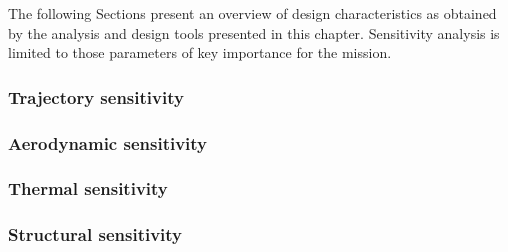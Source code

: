The following Sections present an overview of design characteristics as obtained by the analysis and design tools presented in this chapter. Sensitivity analysis is limited to those parameters of key importance for the mission.
\subsubsection{Trajectory sensitivity}\label{subsec:orbitsens}


\subsubsection{Aerodynamic sensitivity}\label{subsec:aerosens}


%

\subsubsection{Thermal sensitivity}\label{subsec:thermalsens}


\subsubsection{Structural sensitivity}\label{subsec:strucsens}






